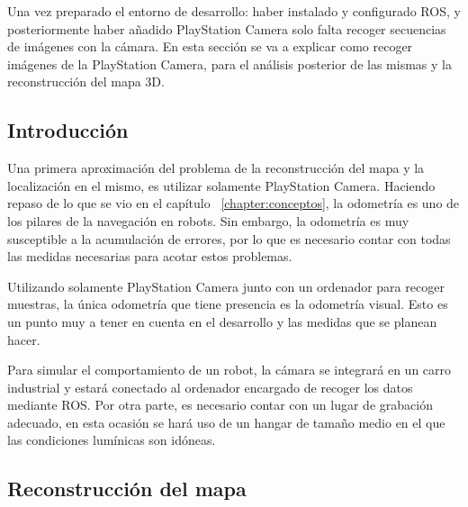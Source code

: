 

Una vez preparado el entorno de desarrollo: haber instalado y configurado ROS,
y posteriormente haber añadido PlayStation Camera solo falta recoger secuencias
de imágenes con la cámara. En esta sección se va a explicar como recoger
imágenes de la PlayStation Camera, para el análisis posterior de las mismas y
la reconstrucción del mapa 3D.

\subsection{Introducción}

Una primera aproximación del problema de la reconstrucción del mapa y la
localización en el mismo, es utilizar solamente PlayStation Camera. Haciendo
repaso de lo que se vio en el capítulo ~\ref{chapter:conceptos}, la odometría es
uno de los pilares de la navegación en robots. Sin embargo, la odometría es muy
susceptible a la acumulación de errores, por lo que es necesario contar con
todas las medidas necesarias para acotar estos problemas.

Utilizando solamente PlayStation Camera junto con un ordenador para recoger
muestras, la única odometría que tiene presencia es la odometría visual. Esto es
un punto muy a tener en cuenta en el desarrollo y las medidas que se planean
hacer.


Para simular el comportamiento de un robot, la cámara se integrará en un carro
industrial y estará conectado al ordenador encargado de recoger los datos
mediante ROS. Por otra parte, es necesario contar con un lugar de grabación
adecuado, en esta ocasión se hará uso de un hangar de tamaño medio en el que las
condiciones lumínicas son idóneas.

\subsection{Reconstrucción del mapa}

